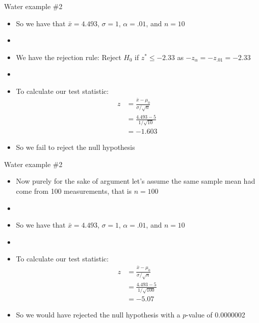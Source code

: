 \documentclass[xcolor=dvipsnames]{beamer}
\begin{document}
\begin{frame}{Water example \#2}
	\begin{itemize}
		\item So we have that $\bar{x} = 4.493$, $\sigma = 1$, $\alpha = .01$, and $n = 10$
		\item[]
		\item We have the rejection rule: Reject $H_0$ if $z^* \leq -2.33$ as  $-z_{\alpha} = -z_{.01}= -2.33$
		\item[]
		\item To calculate our test statistic:
		\begin{align*}
			z &= \frac{\bar{x}-\mu_0}{\sigma / \sqrt{n}} \\
			&=\frac{4.493-5}{1 / \sqrt{10}} \\
			&= -1.603
		\end{align*}
		\item So we fail to reject the null hypothesis
	\end{itemize}
\end{frame}

\begin{frame}{Water example \#2}
	\begin{itemize}
		\item Now purely for the sake of argument let's assume the same sample mean had come from 100 measurements, that is $n = 100$
		\item[]
		\item So we have that $\bar{x} = 4.493$, $\sigma = 1$, $\alpha = .01$, and $n = 10$
		\item[]
		\item To calculate our test statistic:
		\begin{align*}
		z &= \frac{\bar{x}-\mu_0}{\sigma / \sqrt{n}} \\
		&=\frac{4.493-5}{1 / \sqrt{100}} \\
		&= -5.07
		\end{align*}
		\item So we would have rejected the null hypothesis with a $p$-value of 0.0000002
	\end{itemize}
\end{frame}
\end{document}
